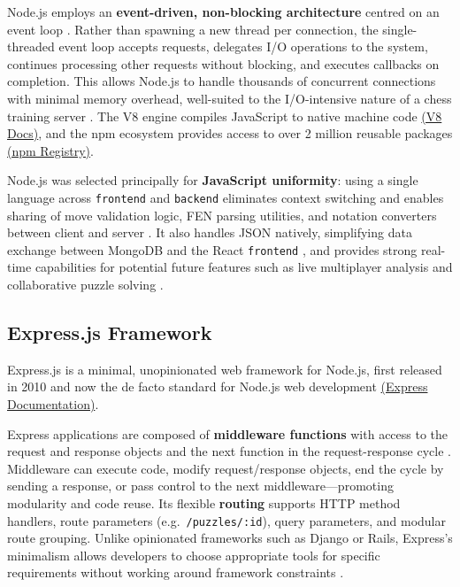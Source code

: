 Node.js employs an \textbf{event-driven, non-blocking architecture} centred on an event loop \cite{tilkov2010nodejs}. Rather than spawning a new thread per connection, the single-threaded event loop accepts requests, delegates I/O operations to the system, continues processing other requests without blocking, and executes callbacks on completion. This allows Node.js to handle thousands of concurrent connections with minimal memory overhead, well-suited to the I/O-intensive nature of a chess training server \cite{chaniotis2015nodejs}. The V8 engine compiles JavaScript to native machine code \href{https://v8.dev/docs}{(V8 Docs)}, and the npm ecosystem provides access to over 2 million reusable packages \href{https://www.npmjs.com/}{(npm Registry)}.

Node.js was selected principally for \textbf{JavaScript uniformity}: using a single language across \texttt{frontend} and \texttt{backend} eliminates context switching and enables sharing of move validation logic, FEN parsing utilities, and notation converters between client and server \cite{pautasso2016rest}. It also handles JSON natively, simplifying data exchange between MongoDB and the React \texttt{frontend} \cite{nurseitov2009json}, and provides strong real-time capabilities for potential future features such as live multiplayer analysis and collaborative puzzle solving \cite{pimentel2012websockets}.

\subsection*{Express.js Framework}
Express.js is a minimal, unopinionated web framework for Node.js, first released in 2010 and now the de facto standard for Node.js web development \href{https://expressjs.com/}{(Express Documentation)}.

Express applications are composed of \textbf{middleware functions} with access to the request and response objects and the next function in the request-response cycle \cite{brown2014express}. Middleware can execute code, modify request/response objects, end the cycle by sending a response, or pass control to the next middleware---promoting modularity and code reuse. Its flexible \textbf{routing} supports HTTP method handlers, route parameters (e.g.\ \texttt{/puzzles/:id}), query parameters, and modular route grouping. Unlike opinionated frameworks such as Django or Rails, Express's minimalism allows developers to choose appropriate tools for specific requirements without working around framework constraints \cite{mardan2014express}.

